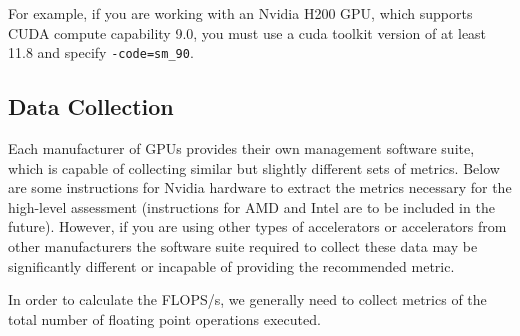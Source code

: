 For example, if you are working with an Nvidia H200 GPU, which supports CUDA compute capability 9.0, you must use a cuda toolkit version of at least 11.8 and specify \verb|-code=sm_90|.


\subsection{Data Collection}

Each manufacturer of GPUs provides their own management software suite, which is capable of collecting similar but slightly different sets of metrics. Below are some instructions for Nvidia hardware to extract the metrics necessary for the high-level assessment (instructions for AMD and Intel are to be included in the future).
However, if you are using other types of accelerators or accelerators from other manufacturers the software suite required to collect these data may be significantly different or incapable of providing the recommended metric.

In order to calculate the FLOPS/s, we generally need to collect metrics of the total number of floating point operations executed.




